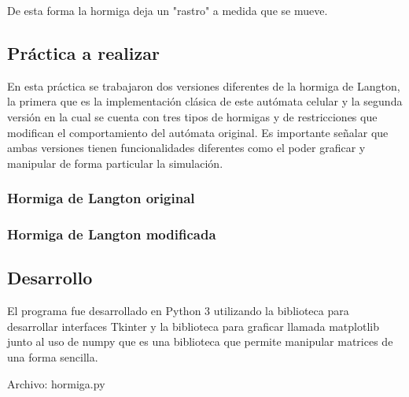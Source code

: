 De esta forma la hormiga deja un "rastro" a medida que se mueve.

\subsection{Práctica a realizar}
En esta práctica se trabajaron dos versiones diferentes de la hormiga de Langton, la primera que es la implementación clásica de este autómata celular y la segunda versión en la cual se cuenta con tres tipos de hormigas y de restricciones que modifican el comportamiento del autómata original. Es importante señalar que ambas versiones tienen funcionalidades diferentes como el poder graficar y manipular de forma particular la simulación.
\subsubsection{Hormiga de Langton original}
\subsubsection{Hormiga de Langton modificada}

\subsection{Desarrollo}
El programa fue desarrollado en Python 3 utilizando la biblioteca para desarrollar interfaces Tkinter y la biblioteca para graficar llamada matplotlib junto al uso de numpy que es una biblioteca que permite manipular matrices de una forma sencilla.

Archivo: hormiga.py

